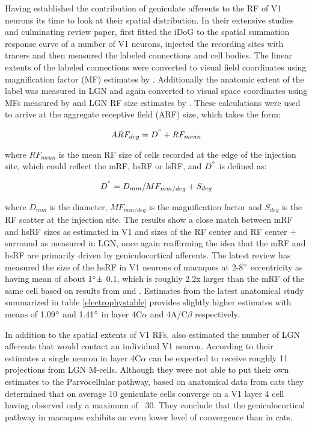 Having established the contribution of geniculate afferents to the RF
of V1 neurons its time to look at their spatial distribution. In their
extensive studies and culminating review paper, \cite{Angelucci2006}
first fitted the iDoG to the spatial summation response curve of a
number of V1 neurons, injected the recording sites with tracers and
then measured the labeled connections and cell bodies. The linear
extents of the labeled connections were converted to visual field
coordinates using magnification factor (MF) estimates by
\cite{VanEssen1984}. Additionally the anatomic extent of the label was
measured in LGN and again converted to visual space coordinates using
MFs measured by \cite{Connolly1984} and LGN RF size estimates by
\cite{Derrington1984}. These calculations were used to arrive at the
aggregate receptive field (ARF) size, which takes the form:

\begin{equation}
  ARF_{deg} = D^{\degree} + RF_{mean}
\end{equation}

where $RF_{mean}$ is the mean RF size of cells recorded at the edge of
the injection site, which could reflect the mRF, hsRF or lsRF, and
$D^{\degree}$ is defined as:

\begin{equation}
  D^{\degree} = D_{mm} / MF_{mm/deg} + S_{deg}
\end{equation}

where $D_{mm}$ is the diameter, $MF_{mm/deg}$ is the magnification
factor and $S_{deg}$ is the RF scatter at the injection site. The
results show a close match between mRF and hsRF sizes as estimated in
V1 and sizes of the RF center and RF center + surround as measured in
LGN, once again reaffirming the idea that the mRF and hsRF are
primarily driven by geniculocortical afferents. The latest review
\citep{Angelucci2006} has measured the size of the hsRF in V1 neurons
of macaques at 2-8$\degree$ eccentricity as having mean of about
1$\degree \pm$ 0.1, which is roughly 2.2x larger than the mRF of the
same cell based on results from \cite{Angelucci2002} and
\cite{Levitt2002}. Estimates from the latest anatomical study
summarized in table \ref{electrophystable} provides slightly higher
estimates with means of 1.09$\degree$ and 1.41$\degree$ in layer
4C$\alpha$ and 4A/C$\beta$ respectively.

In addition to the spatial extents of V1 RFs, \cite{Angelucci2006a}
also estimated the number of LGN afferents that would contact an
individual V1 neuron. According to their estimates a single neuron in
layer 4C$\alpha$ can be expected to receive roughly 11 projections
from LGN M-cells. Although they were not able to put their own
estimates to the Parvocellular pathway, based on anatomical data from
cats they determined that on average 10 geniculate cells converge on a
V1 layer 4 cell having observed only a maximum of ~30. They conclude
that the geniculocortical pathway in macaques exhibits an even lower
level of convergence than in cats.

